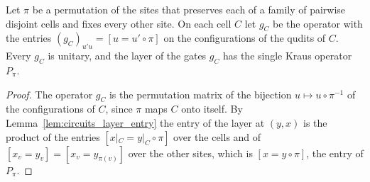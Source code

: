 \begin{lemma}
    \label{lem:protocols_perm_layer}
    \leanok
    Let $\pi$ be a permutation of the sites that preserves each of a family of pairwise disjoint
    cells and fixes every other site. On each cell $C$ let $g_C$ be the operator with the
    entries $(g_C)_{u'u}=[u=u'\circ\pi]$ on the configurations of the qudits of $C$. Every
    $g_C$ is unitary, and the layer of the gates $g_C$ has the single Kraus operator $P_\pi$.
\end{lemma}
\begin{proof}\leanok
    The operator $g_C$ is the permutation matrix of the bijection $u\mapsto u\circ\pi^{-1}$ of
    the configurations of $C$, since $\pi$ maps $C$ onto itself. By
    Lemma~\ref{lem:circuits_layer_entry} the entry of the layer at $(y,x)$ is the product of
    the entries $[x|_C=y|_C\circ\pi]$ over the cells and of $[x_v=y_v]=[x_v=y_{\pi(v)}]$ over
    the other sites, which is $[x=y\circ\pi]$, the entry of $P_\pi$.
\end{proof}

